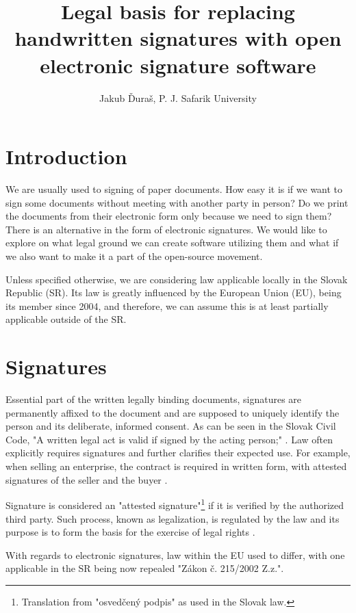 \documentclass[a4paper,twocolumn]{article}
\title{Legal basis for replacing handwritten signatures with open electronic signature software}
\author{Jakub Ďuraš, P. J. Safarik University}
\begin{document}
{
    \maketitle
}

\section*{Introduction}

We are usually used to signing of paper documents.
How easy it is if we want to sign some documents without meeting with another party in person?
Do we print the documents from their electronic form only because we need to sign them? There is an alternative in the form of electronic signatures.
We would like to explore on what legal ground we can create software utilizing them and what if we also want to make it a part of the open-source movement.

Unless specified otherwise, we are considering law applicable locally in the Slovak Republic (SR).
Its law is greatly influenced by the European Union (EU), being its member since 2004, and therefore, we can assume this is at least partially applicable outside of the SR.

\section{Signatures}

Essential part of the written legally binding documents, signatures are permanently affixed to the document and are supposed to uniquely identify the person and its deliberate, informed consent.
As can be seen in the Slovak Civil Code, "A written legal act is valid if signed by the acting person;" \cite{1}.
Law often explicitly requires signatures and further clarifies their expected use.
For example, when selling an enterprise, the contract is required in written form, with attested signatures of the seller and the buyer \cite{2}.

Signature is considered an "attested signature"\footnote{Translation from "osvedčený podpis" as used in the Slovak law.} if it is verified by the authorized third party.
Such process, known as legalization, is regulated by the law and its purpose is to form the basis for the exercise of legal rights \cite{3}.

With regards to electronic signatures, law within the EU used to differ, with one applicable in the SR being now repealed "Zákon č. 215/2002 Z.z.".
\end{document}

